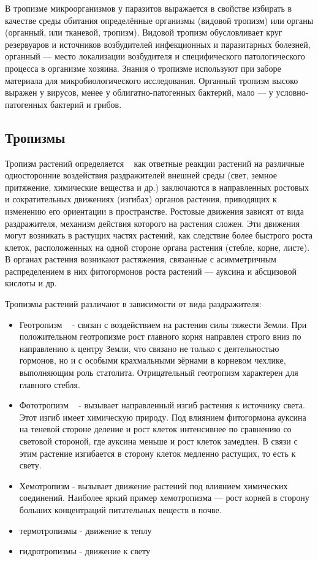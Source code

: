 \documentclass[11pt]{article}
\begin{document}
В тропизме микроорганизмов у паразитов выражается в свойстве избирать в качестве среды обитания определённые организмы (видовой тропизм) или органы (органный, или тканевой, тропизм). Видовой тропизм обусловливает круг резервуаров и источников возбудителей инфекционных и паразитарных болезней, органный — место локализации возбудителя и специфического патологического процесса в организме хозяина.
Знания о тропизме используют при заборе материала для микробиологического исследования. Органный тропизм высоко выражен у вирусов, менее у облигатно-патогенных бактерий, мало — у условно-патогенных бактерий и грибов.



\subsection{Тропизмы}
Тропизм растений определяется ~\cite{dic_tropism} как ответные реакции растений на различные односторонние воздействия раздражителей внешней среды (свет, земное притяжение, химические вещества и др.) заключаются в направленных ростовых и сократительных движениях (изгибах) органов растения, приводящих к изменению его ориентации в пространстве. Ростовые движения зависят от вида раздражителя, механизм действия которого на растения сложен. Эти движения могут возникать в растущих частях растений, как следствие более быстрого роста клеток, расположенных на одной стороне органа растения (стебле, корне, листе). В органах растения возникают растяжения, связанные с асимметричным распределением в них фитогормонов роста растений — ауксина и абсцизовой кислоты и др.

Тропизмы растений различают в зависимости от вида раздражителя:

\begin{itemize} 
\item Геотропизм ~\cite{geo_tropism} - связан с воздействием на растения силы тяжести Земли. При положительном геотропизме рост главного корня направлен строго вниз по направлению к центру Земли, что связано не только с деятельностью гормонов, но и с особыми крахмальными зёрнами в корневом чехлике, выполняющим роль статолита. Отрицательный геотропизм характерен для главного стебля.
\item Фототропизм ~\cite{photo_tropism} - вызывает направленный изгиб растения к источнику света. Этот изгиб имеет химическую природу. Под влиянием фитогормона ауксина на теневой стороне деление и рост клеток интенсивнее по сравнению со световой стороной, где ауксина меньше и рост клеток замедлен. В связи с этим растение изгибается в сторону клеток медленно растущих, то есть к свету.
\item Хемотропизм - вызывает движение растений под влиянием химических соединений. Наиболее яркий пример хемотропизма — рост корней в сторону больших концентраций питательных веществ в почве.
\item термотропизмы - движение к теплу
\item гидротропизмы - движение к свету
\end{itemize} 
\end{document}
